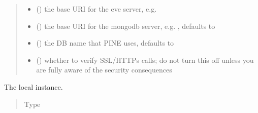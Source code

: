 \documentclass[letterpaper,10pt,english]{sphinxmanual}
\begin{document}
\begin{fulllineitems}
\begin{quote}
\begin{description}
\begin{itemize}
\item {} 
\sphinxAtStartPar
{} () \textendash{} the base URI for the eve server, e.g. 

\item {} 
\sphinxAtStartPar
{} (\sphinxstyleliteralemphasis{\sphinxupquote{, }}) \textendash{} the base URI for the mongodb server, e.g. , defaults to 

\item {} 
\sphinxAtStartPar
{} (\sphinxstyleliteralemphasis{\sphinxupquote{, }}) \textendash{} the DB name that PINE uses, defaults to 

\item {} 
\sphinxAtStartPar
{} (\sphinxstyleliteralemphasis{\sphinxupquote{, }}) \textendash{} whether to verify SSL/HTTPs calls; do not turn this off unless you
are fully aware of the security consequences

\end{itemize}

\end{description}\end{quote}

\begin{fulllineitems}
\label{\detokenize{autoapi/pine/client/client/index:pine.client.client.LocalPineClient.eve}}
\sphinxAtStartPar
The local {\hyperref[\detokenize{autoapi/pine/client/client/index:pine.client.client.EveClient}]{}} instance.
\begin{quote}\begin{description}
\item[{Type}] \leavevmode
\sphinxAtStartPar
{\hyperref[\detokenize{autoapi/pine/client/client/index:pine.client.client.EveClient}]{}}


\end{description}
\end{quote}
\end{fulllineitems}
\end{fulllineitems}
\end{document}
